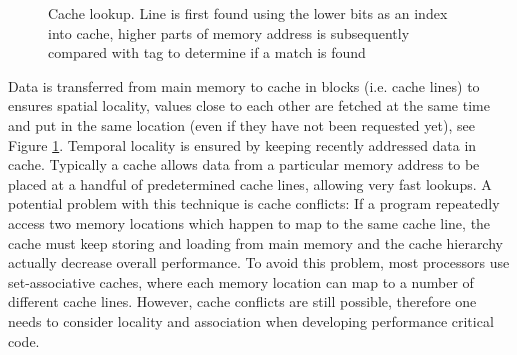 \documentclass[12pt,a4paper,twoside]{report}
\begin{document}
{\begin{figure}[H]
		\caption{Cache lookup. Line is first found using the lower bits as an
		index into cache, higher parts of memory address is subsequently
		compared with tag to determine if a match is found}
		\label{fig:cache-lines}
	\end{figure}
	
	Data is transferred from main memory to cache in blocks (i.e.
	cache lines) to ensures spatial locality, values close to each
	other are fetched at the same time and put in the same location
	(even if they have not been requested yet), see Figure \ref{fig:cache-lines}. Temporal
	locality is ensured by keeping recently addressed data in cache.
	Typically a cache allows data from a particular memory address to
	be placed at a handful of predetermined cache lines, allowing very
	fast lookups. A potential problem with this technique is cache
	conflicts: If a program repeatedly access two memory locations
	which happen to map to the same cache line, the cache must keep
	storing and loading from main memory and the cache hierarchy
	actually decrease overall performance. To avoid this problem, most
	processors use set-associative caches, where each memory location
	can map to a number of different cache lines. However, cache
	conflicts are still possible, therefore one needs to consider
	locality and association when developing performance critical
	code.

}
\end{document}
